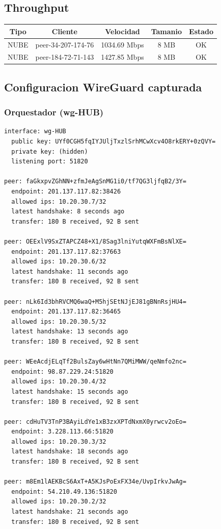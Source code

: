 \documentclass[11pt,a4paper]{article}
\begin{document}
\subsection{Throughput}
\begin{longtable}{|c|c|c|c|c|}
\hline
Tipo & Cliente & Velocidad & Tamanio & Estado \\ \hline
NUBE & peer-34-207-174-76 & 1034.69 Mbps & 8 MB & OK \\ \hline
NUBE & peer-184-72-71-143 & 1427.85 Mbps & 8 MB & OK \\ \hline
\end{longtable}

\subsection{Configuracion WireGuard capturada}
\subsubsection*{Orquestador (wg-HUB)}
\begin{lstlisting}
interface: wg-HUB
  public key: UYf0CGH5fqIYJUljTxzlSrhMCwXcv4O8rkERY+0zQVY=
  private key: (hidden)
  listening port: 51820

peer: faGkxpvZGhNN+zfmJeAgSnMG1i0/tf7QG3ljfqB2/3Y=
  endpoint: 201.137.117.82:38426
  allowed ips: 10.20.30.7/32
  latest handshake: 8 seconds ago
  transfer: 180 B received, 92 B sent

peer: OEExlV9SxZTAPCZ48+X1/8Sag3lniYutqWXFmBsNlXE=
  endpoint: 201.137.117.82:37663
  allowed ips: 10.20.30.6/32
  latest handshake: 11 seconds ago
  transfer: 180 B received, 92 B sent

peer: nLk6Id3bhRVCMQ6waQ+M5hjSEtNJjEJ81gBNnRsjHU4=
  endpoint: 201.137.117.82:36465
  allowed ips: 10.20.30.5/32
  latest handshake: 13 seconds ago
  transfer: 180 B received, 92 B sent

peer: WEeAcdjELqTf2BulsZay6wHtNn7QMiMWW/qeNmfo2nc=
  endpoint: 98.87.229.24:51820
  allowed ips: 10.20.30.4/32
  latest handshake: 15 seconds ago
  transfer: 180 B received, 92 B sent

peer: cdHuTV3TnP3BAyiLdYe1xB3zxXPTdNxmX0yrwcv2oEo=
  endpoint: 3.228.113.66:51820
  allowed ips: 10.20.30.3/32
  latest handshake: 18 seconds ago
  transfer: 180 B received, 92 B sent

peer: m8Em1lAEKBcS6AxT+A5KJsPoExFX34e/UvpIrkvJwAg=
  endpoint: 54.210.49.136:51820
  allowed ips: 10.20.30.2/32
  latest handshake: 21 seconds ago
  transfer: 180 B received, 92 B sent

\end{lstlisting}
\end{document}
